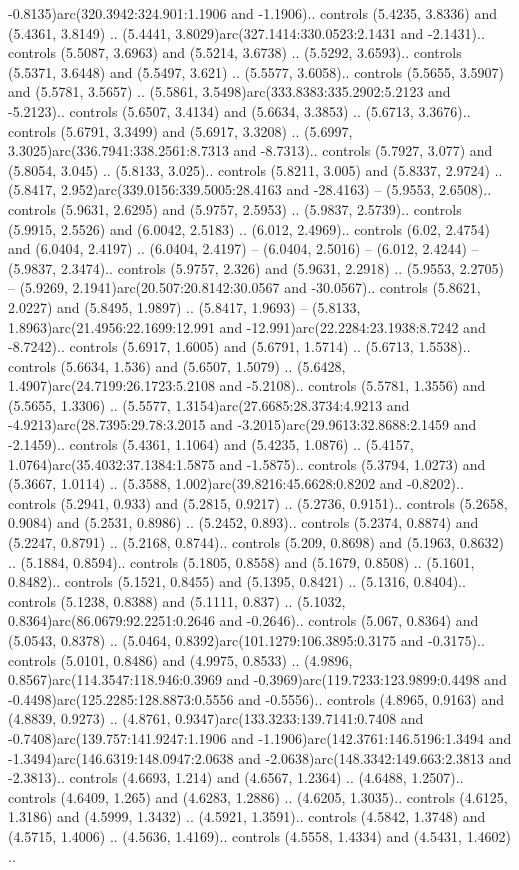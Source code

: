 -0.8135)arc(320.3942:324.901:1.1906 and -1.1906).. controls (5.4235, 3.8336) and (5.4361, 3.8149) .. (5.4441, 3.8029)arc(327.1414:330.0523:2.1431 and -2.1431).. controls (5.5087, 3.6963) and (5.5214, 3.6738) .. (5.5292, 3.6593).. controls (5.5371, 3.6448) and (5.5497, 3.621) .. (5.5577, 3.6058).. controls (5.5655, 3.5907) and (5.5781, 3.5657) .. (5.5861, 3.5498)arc(333.8383:335.2902:5.2123 and -5.2123).. controls (5.6507, 3.4134) and (5.6634, 3.3853) .. (5.6713, 3.3676).. controls (5.6791, 3.3499) and (5.6917, 3.3208) .. (5.6997, 3.3025)arc(336.7941:338.2561:8.7313 and -8.7313).. controls (5.7927, 3.077) and (5.8054, 3.045) .. (5.8133, 3.025).. controls (5.8211, 3.005) and (5.8337, 2.9724) .. (5.8417, 2.952)arc(339.0156:339.5005:28.4163 and -28.4163) -- (5.9553, 2.6508).. controls (5.9631, 2.6295) and (5.9757, 2.5953) .. (5.9837, 2.5739).. controls (5.9915, 2.5526) and (6.0042, 2.5183) .. (6.012, 2.4969).. controls (6.02, 2.4754) and (6.0404, 2.4197) .. (6.0404, 2.4197) -- (6.0404, 2.5016) -- (6.012, 2.4244) -- (5.9837, 2.3474).. controls (5.9757, 2.326) and (5.9631, 2.2918) .. (5.9553, 2.2705) -- (5.9269, 2.1941)arc(20.507:20.8142:30.0567 and -30.0567).. controls (5.8621, 2.0227) and (5.8495, 1.9897) .. (5.8417, 1.9693) -- (5.8133, 1.8963)arc(21.4956:22.1699:12.991 and -12.991)arc(22.2284:23.1938:8.7242 and -8.7242).. controls (5.6917, 1.6005) and (5.6791, 1.5714) .. (5.6713, 1.5538).. controls (5.6634, 1.536) and (5.6507, 1.5079) .. (5.6428, 1.4907)arc(24.7199:26.1723:5.2108 and -5.2108).. controls (5.5781, 1.3556) and (5.5655, 1.3306) .. (5.5577, 1.3154)arc(27.6685:28.3734:4.9213 and -4.9213)arc(28.7395:29.78:3.2015 and -3.2015)arc(29.9613:32.8688:2.1459 and -2.1459).. controls (5.4361, 1.1064) and (5.4235, 1.0876) .. (5.4157, 1.0764)arc(35.4032:37.1384:1.5875 and -1.5875).. controls (5.3794, 1.0273) and (5.3667, 1.0114) .. (5.3588, 1.002)arc(39.8216:45.6628:0.8202 and -0.8202).. controls (5.2941, 0.933) and (5.2815, 0.9217) .. (5.2736, 0.9151).. controls (5.2658, 0.9084) and (5.2531, 0.8986) .. (5.2452, 0.893).. controls (5.2374, 0.8874) and (5.2247, 0.8791) .. (5.2168, 0.8744).. controls (5.209, 0.8698) and (5.1963, 0.8632) .. (5.1884, 0.8594).. controls (5.1805, 0.8558) and (5.1679, 0.8508) .. (5.1601, 0.8482).. controls (5.1521, 0.8455) and (5.1395, 0.8421) .. (5.1316, 0.8404).. controls (5.1238, 0.8388) and (5.1111, 0.837) .. (5.1032, 0.8364)arc(86.0679:92.2251:0.2646 and -0.2646).. controls (5.067, 0.8364) and (5.0543, 0.8378) .. (5.0464, 0.8392)arc(101.1279:106.3895:0.3175 and -0.3175).. controls (5.0101, 0.8486) and (4.9975, 0.8533) .. (4.9896, 0.8567)arc(114.3547:118.946:0.3969 and -0.3969)arc(119.7233:123.9899:0.4498 and -0.4498)arc(125.2285:128.8873:0.5556 and -0.5556).. controls (4.8965, 0.9163) and (4.8839, 0.9273) .. (4.8761, 0.9347)arc(133.3233:139.7141:0.7408 and -0.7408)arc(139.757:141.9247:1.1906 and -1.1906)arc(142.3761:146.5196:1.3494 and -1.3494)arc(146.6319:148.0947:2.0638 and -2.0638)arc(148.3342:149.663:2.3813 and -2.3813).. controls (4.6693, 1.214) and (4.6567, 1.2364) .. (4.6488, 1.2507).. controls (4.6409, 1.265) and (4.6283, 1.2886) .. (4.6205, 1.3035).. controls (4.6125, 1.3186) and (4.5999, 1.3432) .. (4.5921, 1.3591).. controls (4.5842, 1.3748) and (4.5715, 1.4006) .. (4.5636, 1.4169).. controls (4.5558, 1.4334) and (4.5431, 1.4602) .. 